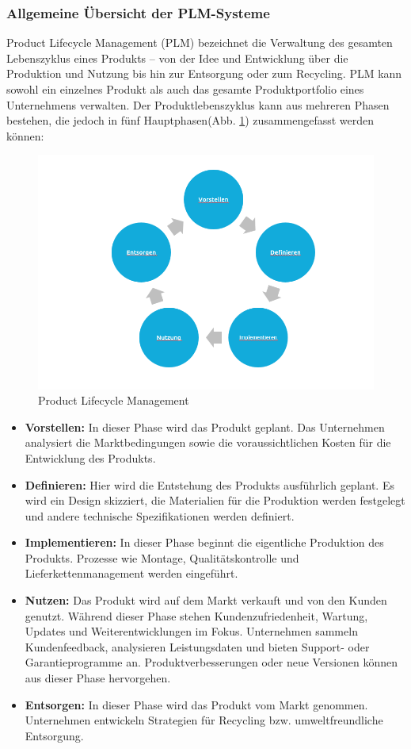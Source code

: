 \documentclass[a4paper, 12pt]{scrartcl}
\begin{document}
	\subsubsection{Allgemeine Übersicht der PLM-Systeme}
	Product Lifecycle Management (PLM) bezeichnet die Verwaltung des gesamten Lebenszyklus eines Produkts – von der Idee und Entwicklung über die Produktion und Nutzung bis hin zur Entsorgung oder zum Recycling. PLM kann sowohl ein einzelnes Produkt als auch das gesamte Produktportfolio eines Unternehmens verwalten\cite{stark2011product}.
	\newline
	Der Produktlebenszyklus kann aus mehreren Phasen bestehen, die jedoch in fünf Hauptphasen(Abb. \ref{PLM}) zusammengefasst werden können:
	\begin{figure}[h!]
		\begin{center}
			\includegraphics[width=12cm]{PLM.png}
			\caption{ Product Lifecycle Management\cite{stark2011product}}
			\label{PLM}
		\end{center}
	\end{figure}
	\begin{itemize}
		\item \textbf{Vorstellen:} In dieser Phase wird das Produkt geplant. Das Unternehmen analysiert die Marktbedingungen sowie die voraussichtlichen Kosten für die Entwicklung des Produkts.
		\item \textbf{Definieren:} Hier wird die Entstehung des Produkts ausführlich geplant. Es wird ein Design skizziert, die Materialien für die Produktion werden festgelegt und andere technische Spezifikationen werden definiert.
		\item \textbf{Implementieren:} In dieser Phase beginnt die eigentliche Produktion des Produkts. Prozesse wie Montage, Qualitätskontrolle und Lieferkettenmanagement werden eingeführt.
		\item \textbf{Nutzen:} Das Produkt wird auf dem Markt verkauft und von den Kunden genutzt. Während dieser Phase stehen Kundenzufriedenheit, Wartung, Updates und Weiterentwicklungen im Fokus. Unternehmen sammeln Kundenfeedback, analysieren Leistungsdaten und bieten Support- oder Garantieprogramme an. Produktverbesserungen oder neue Versionen können aus dieser Phase hervorgehen.
		\item \textbf{Entsorgen:} In dieser Phase wird das Produkt vom Markt genommen. Unternehmen entwickeln Strategien für Recycling bzw. umweltfreundliche Entsorgung.
	\end{itemize}
\end{document}
